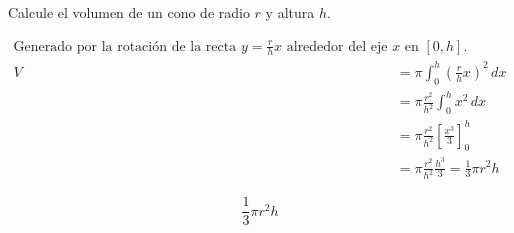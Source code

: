 Calcule el volumen de un cono de radio $r$ y altura $h$.

\nopagebreak
\begin{align*}
\text{Generado por la rotación de la recta } y = \frac{r}{h}x \text{ alrededor del eje } x \text{ en } [0,h]. \\
V &= \pi \int_{0}^{h} \left(\frac{r}{h}x\right)^2 \, dx \\
&= \pi \frac{r^2}{h^2} \int_{0}^{h} x^2 \, dx \\
&= \pi \frac{r^2}{h^2} \left[ \frac{x^3}{3} \right]_{0}^{h} \\
&= \pi \frac{r^2}{h^2} \frac{h^3}{3} = \frac{1}{3} \pi r^2 h
\end{align*}

\[
\boxed{\displaystyle \frac{1}{3} \pi r^2 h}
\]
